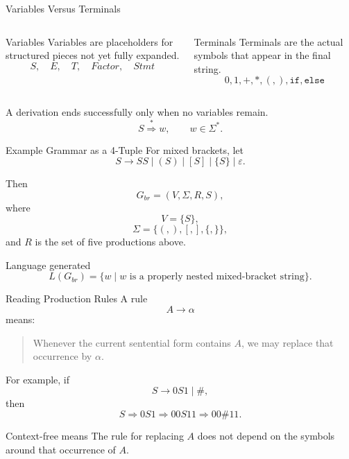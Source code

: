 \documentclass[aspectratio=169,10pt]{beamer}
\newcommand{\eps}{\varepsilon}
\newcommand{\der}{\Rightarrow}
\newcommand{\ders}{\overset{*}{\Rightarrow}}
\newcommand{\code}[1]{\texttt{#1}}
\begin{document}
\begin{frame}{Variables Versus Terminals}
\small
\begin{columns}[T,onlytextwidth]
\begin{block}{Variables}
Variables are placeholders for structured pieces not yet fully expanded.
\[
S,\quad E,\quad T,\quad Factor,\quad Stmt
\]
\end{block}

\begin{exampleblock}{Terminals}
Terminals are the actual symbols that appear in the final string.
\[
0,1,+,*,(,),\code{if},\code{else}
\]
\end{exampleblock}
\end{columns}

\vspace{0.8em}
A derivation ends successfully only when no variables remain.
\[
S\ders w,
\qquad w\in\Sigma^*.
\]
\end{frame}

\begin{frame}{Example Grammar as a 4-Tuple}
\small
For mixed brackets, let
\[
S\to SS\mid (S)\mid [S]\mid \{S\}\mid\eps.
\]

Then
\[
G_{br}=(V,\Sigma,R,S),
\]
where
\[
V=\{S\},
\]
\[
\Sigma=\{(,),[,],\{,\}\},
\]
and \(R\) is the set of five productions above.

\begin{exampleblock}{Language generated}
\[
L(G_{br})=\{w\mid w\text{ is a properly nested mixed-bracket string}\}.
\]
\end{exampleblock}
\end{frame}

\begin{frame}{Reading Production Rules}
\small
A rule
\[
A\to \alpha
\]
means:

\begin{quote}
Whenever the current sentential form contains \(A\), we may replace that occurrence by \(\alpha\).
\end{quote}

\vspace{0.5em}
For example, if
\[
S\to 0S1\mid\#,
\]
then
\[
S\der 0S1\der 00S11\der 00\#11.
\]

\begin{alertblock}{Context-free means}
The rule for replacing \(A\) does not depend on the symbols around that occurrence of \(A\).
\end{alertblock}
\end{frame}
\end{document}
